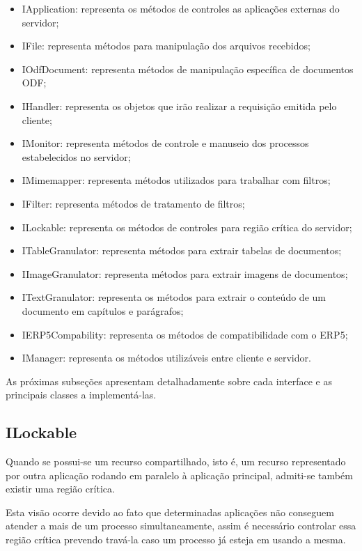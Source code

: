 \begin{itemize}
    \item{IApplication: representa os métodos de controles as aplicações externas do servidor;}
    \item{IFile: representa métodos para manipulação dos arquivos recebidos;}
    \item{IOdfDocument: representa métodos de manipulação específica de documentos ODF;}
    \item{IHandler: representa os objetos que irão realizar a requisição emitida pelo cliente;}
    \item{IMonitor: representa métodos de controle e manuseio dos processos estabelecidos no servidor;}
    \item{IMimemapper: representa métodos utilizados para trabalhar com filtros;}
    \item{IFilter: representa métodos de tratamento de filtros;}
    \item{ILockable: representa os métodos de controles para região crítica do servidor;}
    \item{ITableGranulator: representa métodos para extrair tabelas de documentos;}
    \item{IImageGranulator: representa métodos para extrair imagens de documentos;}
    \item{ITextGranulator: representa os métodos para extrair o conteúdo de um documento em capítulos e parágrafos;}
    \item{IERP5Compability: representa os métodos de compatibilidade com o ERP5;}
    \item{IManager: representa os métodos utilizáveis entre cliente e servidor.}
\end{itemize}

As próximas subseções apresentam detalhadamente sobre cada interface e as principais classes a implementá-las.


\subsection{ILockable}
\label{ilock}

Quando se possui-se um recurso compartilhado, isto é, um recurso representado por outra aplicação rodando em paralelo à aplicação principal, admiti-se também existir uma região crítica.

Esta visão ocorre devido ao fato que determinadas aplicações não conseguem atender a mais de um processo simultaneamente, assim é necessário controlar essa região crítica prevendo travá-la caso um processo já esteja em usando a mesma.

